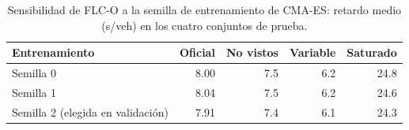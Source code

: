 \begin{table}[t]
\centering
\caption{Sensibilidad de FLC-O a la semilla de entrenamiento de CMA-ES: retardo medio (s/veh) en los cuatro conjuntos de prueba.}
\label{tab:ssemillas}
\scriptsize
\begin{tabular}{@{}lrrrr@{}}
\toprule
Entrenamiento & Oficial & No vistos & Variable & Saturado \\
\midrule
Semilla 0 & 8.00 & 7.5 & 6.2 & 24.8 \\
Semilla 1 & 8.04 & 7.5 & 6.2 & 24.6 \\
Semilla 2 (elegida en validación) & 7.91 & 7.4 & 6.1 & 24.3 \\
\bottomrule
\end{tabular}
\end{table}
